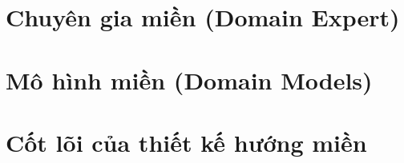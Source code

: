 
\section{Chuyên gia miền (Domain Expert)}



\section{Mô hình miền (Domain Models)}




\section{Cốt lõi của thiết kế hướng miền}











